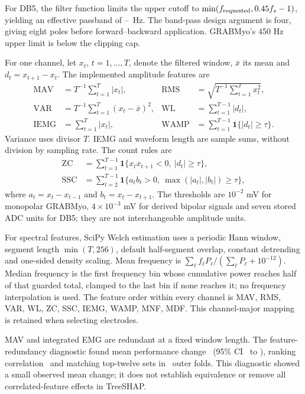 \documentclass{iopjournal}
\begin{document}
For DB5, the filter function limits the upper cutoff to $\min(f_{\rm requested},0.45f_s-1)$, yielding an effective passband of \RevDBFiveBandLow--\RevDBFiveBandHigh\ Hz. The band-pass design argument is four, giving eight poles before forward--backward application. GRABMyo's 450 Hz upper limit is below the clipping cap.

For one channel, let $x_t$, $t=1,\ldots,T$, denote the filtered window, $\bar x$ its mean and $d_t=x_{t+1}-x_t$. The implemented amplitude features are
\begin{align*}
\mathrm{MAV}&=T^{-1}\sum_{t=1}^T|x_t|,&
\mathrm{RMS}&=\sqrt{T^{-1}\sum_{t=1}^Tx_t^2},\\
\mathrm{VAR}&=T^{-1}\sum_{t=1}^T(x_t-\bar x)^2,&
\mathrm{WL}&=\sum_{t=1}^{T-1}|d_t|,\\
\mathrm{IEMG}&=\sum_{t=1}^T|x_t|,&
\mathrm{WAMP}&=\sum_{t=1}^{T-1}\mathbf{1}\{|d_t|\ge\tau\}.
\end{align*}
Variance uses divisor $T$. IEMG and waveform length are sample sums, without division by sampling rate. The count rules are
\begin{align*}
\mathrm{ZC}&=\sum_{t=1}^{T-1}\mathbf{1}\{x_tx_{t+1}<0,\ |d_t|\ge\tau\},\\
\mathrm{SSC}&=\sum_{t=2}^{T-1}\mathbf{1}\{a_tb_t>0,\ \max(|a_t|,|b_t|)\ge\tau\},
\end{align*}
where $a_t=x_t-x_{t-1}$ and $b_t=x_t-x_{t+1}$. The thresholds are $10^{-2}$ mV for monopolar GRABMyo, $4\times10^{-3}$ mV for derived bipolar signals and seven stored ADC units for DB5; they are not interchangeable amplitude units.

For spectral features, SciPy Welch estimation uses a periodic Hann window, segment length $\min(T,256)$, default half-segment overlap, constant detrending and one-sided density scaling. Mean frequency is $\sum_\ell f_\ell P_\ell/(\sum_\ell P_\ell+10^{-12})$. Median frequency is the first frequency bin whose cumulative power reaches half of that guarded total, clamped to the last bin if none reaches it; no frequency interpolation is used. The feature order within every channel is MAV, RMS, VAR, WL, ZC, SSC, IEMG, WAMP, MNF, MDF. This channel-major mapping is retained when selecting electrodes.

MAV and integrated EMG are redundant at a fixed window length. The feature-redundancy diagnostic found mean performance change \RedundDiff\ (95\% CI \RedundLCB\ to \RedundUCB), ranking correlation \RedundRho\ and matching top-twelve sets in \RedundTopTwelveSame\ outer folds. This diagnostic showed a small observed mean change; it does not establish equivalence or remove all correlated-feature effects in TreeSHAP.
\end{document}
